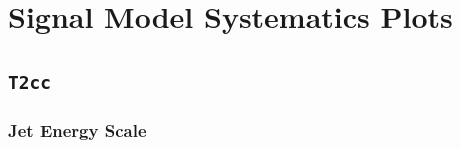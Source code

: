 \chapter{Signal Model Systematics Plots}
\label{ch:app_sig_syst}

\section*{\texttt{T2cc}}
\label{sec:t2cc_syst_plots}

\newpage
\subsection*{Jet Energy Scale}
\label{sec:t2cc_jes_plots}

